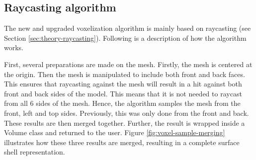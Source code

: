 \subsection{Raycasting algorithm}
\label{sec:method-raycasting-algorithm}
The new and upgraded voxelization algorithm is mainly based on raycasting (see Section \ref{sec:theory-raycasting}). Following is a description of how the algorithm works.

First, several preparations are made on the mesh. Firstly, the mesh is centered at the origin. Then the mesh is manipulated to include both front and back faces. This ensures that raycasting against the mesh will result in a hit against both front and back sides of the model. This means that it is not needed to raycast from all 6 sides of the mesh. Hence, the algorithm samples the mesh from the front, left and top sides. Previously, this was only done from the front and back. These results are then merged together. Further, the result is wrapped inside a Volume class and returned to the user. Figure \ref{fig:voxel-sample-merging} illustrates how these three results are merged, resulting in a complete surface shell representation.
